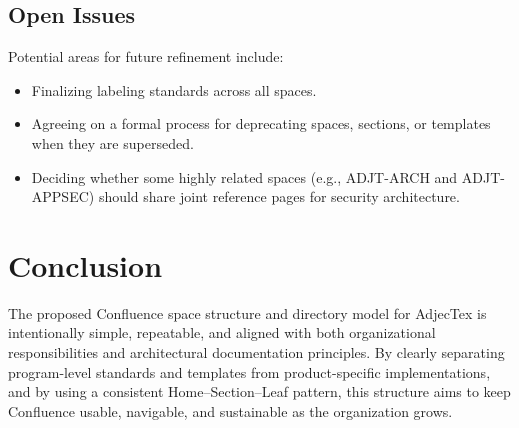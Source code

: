 \documentclass[11pt]{article}
\begin{document}
\subsection{Open Issues}

Potential areas for future refinement include:

\begin{itemize}[leftmargin=*]
  \item Finalizing labeling standards across all spaces.
  \item Agreeing on a formal process for deprecating spaces, sections,
        or templates when they are superseded.
  \item Deciding whether some highly related spaces (e.g.,
        ADJT-ARCH and ADJT-APPSEC) should share joint reference
        pages for security architecture.
\end{itemize}

\section{Conclusion}

The proposed Confluence space structure and directory model for
AdjecTex is intentionally simple, repeatable, and aligned with both
organizational responsibilities and architectural documentation
principles. By clearly separating program-level standards and
templates from product-specific implementations, and by using a
consistent Home--Section--Leaf pattern, this structure aims to keep
Confluence usable, navigable, and sustainable as the organization
grows.
\end{document}
